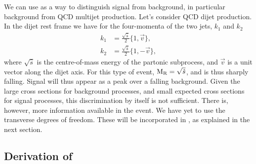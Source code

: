 We can use \mr as a way to distinguish signal from background, in particular background from QCD
multijet production. Let's consider QCD dijet production. In the dijet rest frame we have for the
four-momenta of the two jets, $k_1$ and $k_2$
\begin{align}
  k_1 &= \frac{\sqrt{\hat{s}}}{2} \{1, \vec{v}\} ,\\
  k_2 &= \frac{\sqrt{\hat{s}}}{2} \{1, -\vec{v}\},
\end{align}
where $\sqrt{\hat{s}}$ is the centre-of-mass energy of the partonic subprocess, and $\vec{v}$ is a
unit vector along the dijet axis. For this type of event, $\mathrm{M_R} = \sqrt{\hat{s}}$, and is thus
sharply falling. Signal will thus appear as a peak over a falling background. Given the large cross
sections for background processes, and small expected cross sections for signal processes, this
discrimination by itself is not sufficient. There is, however, more information available in the
event. We have yet to use the transverse degrees of freedom. These will be incorporated in \rsq, as
explained in the next section. 

\subsection{Derivation of \texorpdfstring{\rsq}{R2} \label{sec:razor_r2}}

